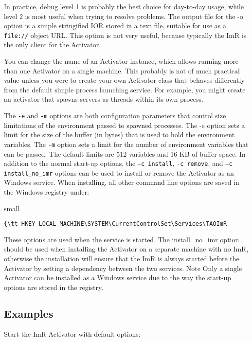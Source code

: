 \begin{itemize}
{\begin{itemize}
\begin{description}
In practice, debug level 1 is probably the best choice for day-to-day usage, while level 2 is most useful 
when trying to resolve problems. 
The output file for the -o option is a simple stringified IOR stored in a text file, suitable for use as a 
{\tt file://} object URL. This option is not very useful, because typically the ImR is the only client for 
the Activator.

You can change the name of an Activator instance, which allows running more than one Activator on a 
single machine. This probably is not of much practical value unless you were to create your own Activator 
class that behaves differently from the default simple process launching service. For example, you might 
create an activator that spawns servers as threads within its own process. 

The {\tt -e} and {\tt -m} options are both configuration parameters that control size limitations of the 
environment passed to spawned processes. The -e option sets a limit for the size of the buffer (in bytes) 
that is used to hold the environment variables. The {\tt -m} option sets a limit for the number of 
environment variables that can be passed. The default limits are 512 variables and 16 KB of buffer space. 
In addition to the normal start-up options, the {\tt –c install}, {\tt -c remove}, and {\tt –c install_no_imr} 
options can be used to install or remove the Activator as an Windows service. When installing, all other 
command line options are saved in the Windows registry under: 

small{
\begin{verbatim}
{\tt HKEY_LOCAL_MACHINE\SYSTEM\CurrentControlSet\Services\TAOImR 
\end{verbatim}
}

These options are used when the service is started. The install_no_imr option should be used when 
installing the Activator on a separate machine with no ImR, otherwise the installation will ensure that
 the ImR is always started before the Activator by setting a dependency between the two services. 
Note Only a single Activator can be installed as a Windows service due to the way the start-up options 
are stored in the registry. 

\subsection{Examples}

Start the ImR Activator with default options:
 

\end{description}
\end{itemize}}
\end{itemize}

